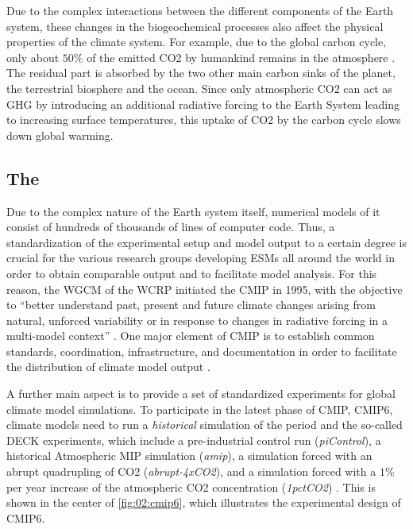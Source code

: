 Due to the complex interactions between the different components of the Earth
system, these changes in the biogeochemical processes also affect the physical
properties of the climate system. For example, due to the global carbon cycle,
only about $50 \unit{\%}$ of the emitted \ac{CO2} by humankind remains in the
atmosphere \autocite{Friedlingstein2020}. The residual part is absorbed by the
two other main carbon sinks of the planet, the terrestrial biosphere and the
ocean. Since only atmospheric \ac{CO2} can act as \ac{GHG} by introducing an
additional radiative forcing to the Earth System leading to increasing surface
temperatures, this uptake of \ac{CO2} by the carbon cycle slows down global
warming.


\subsection{The }
\label{subsec:02:cmip}

Due to the complex nature of the Earth system itself, numerical models of it
consist of hundreds of thousands of lines of computer code. Thus, a
standardization of the experimental setup and model output to a certain degree
is crucial for the various research groups developing \acp{ESM} all around the
world in order to obtain comparable output and to facilitate model analysis.
For this reason, the \ac{WGCM} of the \ac{WCRP} initiated the \acf{CMIP} in
1995, with the objective to \enquote{better understand past, present and future
  climate changes arising from natural, unforced variability or in response to
  changes in radiative forcing in a multi-model context} \autocite{WCRP2020}.
One major element of \ac{CMIP} is to establish common standards, coordination,
infrastructure, and documentation in order to facilitate the distribution of
climate model output \autocite{Eyring2016, Juckes2020}.

A further main aspect is to provide a set of standardized experiments for
global climate model simulations. To participate in the latest phase of
\ac{CMIP}, \acs{CMIP}6, climate models need to run a \emph{historical}
simulation of the period  and the so-called \ac{DECK}
experiments, which include a pre-industrial control run (\emph{piControl}), a
historical Atmospheric \ac{MIP} simulation (\emph{amip}), a simulation forced
with an abrupt quadrupling of \ac{CO2} (\emph{abrupt-4xCO2}), and a simulation
forced with a $1 \unit{\%}$ per year increase of the atmospheric \ac{CO2}
concentration (\emph{1pctCO2}) \autocite{Eyring2016}. This is shown in the
center of \cref{fig:02:cmip6}, which illustrates the experimental design of
\acs{CMIP}6.


